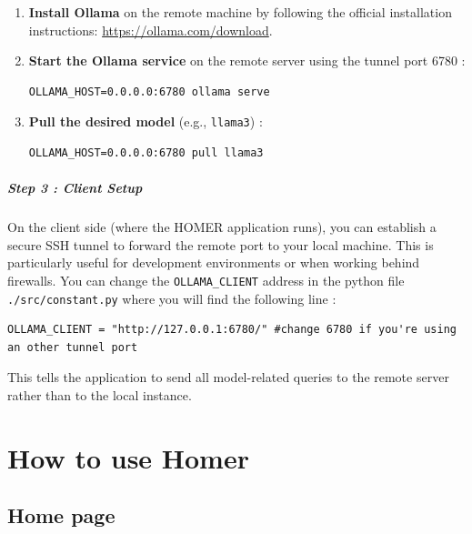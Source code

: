 \documentclass[11pt,a4paper]{report}
\begin{document}
\begin{enumerate}
    \item \textbf{Install Ollama} on the remote machine by following the official installation instructions: \url{https://ollama.com/download}.
    
    \item \textbf{Start the Ollama service} on the remote server using the tunnel port 6780 :
    \begin{lstlisting}
OLLAMA_HOST=0.0.0.0:6780 ollama serve
    \end{lstlisting}
    
    \item \textbf{Pull the desired model} (e.g., \texttt{llama3}) :
    \begin{lstlisting}
OLLAMA_HOST=0.0.0.0:6780 pull llama3
    \end{lstlisting}
    
\end{enumerate}


\paragraph{Step 3 : Client Setup}

On the client side (where the HOMER application runs), you can establish a secure SSH tunnel to forward the remote port to your local machine. This is particularly useful for development environments or when working behind firewalls.
\newline
\newline
You can change the \texttt{OLLAMA\_CLIENT} address in the python file \texttt{./src/constant.py} where you will find the following line : 

\begin{lstlisting}
OLLAMA_CLIENT = "http://127.0.0.1:6780/" #change 6780 if you're using an other tunnel port
\end{lstlisting}

This tells the application to send all model-related queries to the remote server rather than to the local instance.


\chapter{How to use Homer}

\section{Home page}
\end{document}
